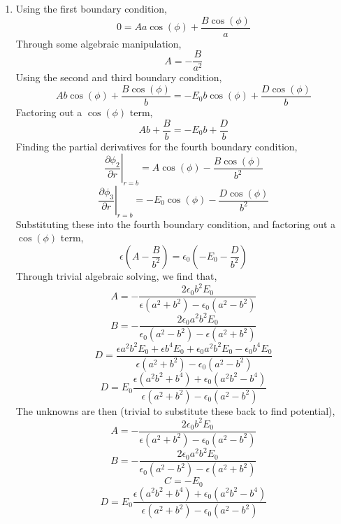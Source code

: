 \documentclass[12pt]{article}
\begin{document}
\begin{enumerate}
\begin{enumerate}
\begin{enumerate}
			\item [c.]
			Using the first boundary condition,
			\[0=Aa\cos(\phi)+\frac{B\cos(\phi)}{a}\]
			Through some algebraic manipulation,
			\[A=-\frac{B}{a^2}\]
			Using the second and third boundary condition,
			\[Ab\cos(\phi)+\frac{B\cos(\phi)}{b}=-E_0b\cos(\phi)+\frac{D\cos(\phi)}{b}\]
			Factoring out a $\cos(\phi)$ term,
			\[Ab + \frac{B}{b}=-E_0b + \frac{D}{b}\]
			Finding the partial derivatives for the fourth boundary condition,
			\[\left.\frac{\partial \phi_2}{\partial r}\right|_{r=b} = A\cos(\phi)-\frac{B\cos(\phi)}{b^2}\]
			\[\left.\frac{\partial \phi_3}{\partial r}\right|_{r=b} = -E_0\cos(\phi)-\frac{D\cos(\phi)}{b^2}\]
			Substituting these into the fourth boundary condition, and factoring out a $\cos(\phi)$ term,
			\[\epsilon\left(A-\frac{B}{b^2}\right)=\epsilon_0\left(-E_0-\frac{D}{b^2}\right)\]
			Through trivial algebraic solving, we find that,
			\[A=-\frac{2\epsilon_0b^2E_0}{\epsilon(a^2+b^2)-\epsilon_0(a^2-b^2)}\]
			\[B=-\frac{2\epsilon_0a^2b^2E_0}{\epsilon_0(a^2-b^2)-\epsilon(a^2+b^2)}\]
			\[D=\frac{\epsilon a^2b^2E_0+\epsilon b^4 E_0+\epsilon_0 a^2b^2E_0-\epsilon_0 b^4E_0}{\epsilon(a^2+b^2)-\epsilon_0(a^2-b^2)}\]
			\[D=E_0\frac{\epsilon(a^2b^2+b^4)+\epsilon_0(a^2b^2-b^4)}{\epsilon(a^2+b^2)-\epsilon_0(a^2-b^2)}\]
			The unknowns are then (trivial to substitute these back to find potential),
			\[\boxed{A=-\frac{2\epsilon_0b^2E_0}{\epsilon(a^2+b^2)-\epsilon_0(a^2-b^2)}}\]
			\[\boxed{B=-\frac{2\epsilon_0a^2b^2E_0}{\epsilon_0(a^2-b^2)-\epsilon(a^2+b^2)}}\]
			\[\boxed{C=-E_0}\]
			\[\boxed{D=E_0\frac{\epsilon(a^2b^2+b^4)+\epsilon_0(a^2b^2-b^4)}{\epsilon(a^2+b^2)-\epsilon_0(a^2-b^2)}}\]


\end{enumerate}
\end{enumerate}
\end{enumerate}
\end{document}
